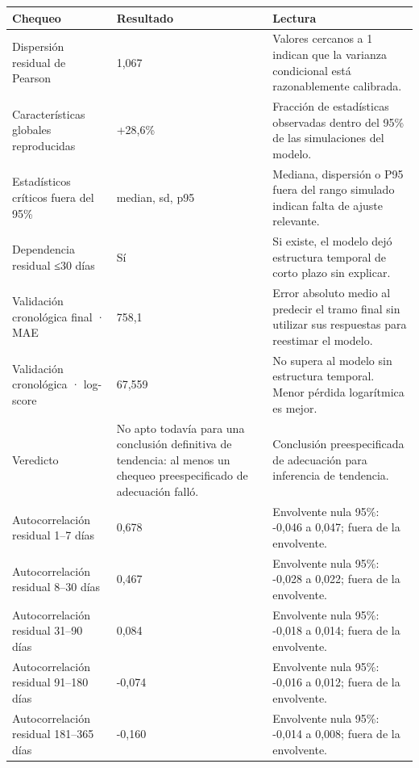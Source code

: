 \begin{tabular}{lll}
\toprule
Chequeo & Resultado & Lectura \\
\midrule
Dispersión residual de Pearson & 1,067 & Valores cercanos a 1 indican que la varianza condicional está razonablemente calibrada. \\
Características globales reproducidas & +28,6\% & Fracción de estadísticas observadas dentro del 95\% de las simulaciones del modelo. \\
Estadísticos críticos fuera del 95\% & median, sd, p95 & Mediana, dispersión o P95 fuera del rango simulado indican falta de ajuste relevante. \\
Dependencia residual ≤30 días & Sí & Si existe, el modelo dejó estructura temporal de corto plazo sin explicar. \\
Validación cronológica final · MAE & 758,1 & Error absoluto medio al predecir el tramo final sin utilizar sus respuestas para reestimar el modelo. \\
Validación cronológica · log-score & 67,559 & No supera al modelo sin estructura temporal. Menor pérdida logarítmica es mejor. \\
Veredicto & No apto todavía para una conclusión definitiva de tendencia: al menos un chequeo preespecificado de adecuación falló. & Conclusión preespecificada de adecuación para inferencia de tendencia. \\
Autocorrelación residual 1–7 días & 0,678 & Envolvente nula 95\%: -0,046 a 0,047; fuera de la envolvente. \\
Autocorrelación residual 8–30 días & 0,467 & Envolvente nula 95\%: -0,028 a 0,022; fuera de la envolvente. \\
Autocorrelación residual 31–90 días & 0,084 & Envolvente nula 95\%: -0,018 a 0,014; fuera de la envolvente. \\
Autocorrelación residual 91–180 días & -0,074 & Envolvente nula 95\%: -0,016 a 0,012; fuera de la envolvente. \\
Autocorrelación residual 181–365 días & -0,160 & Envolvente nula 95\%: -0,014 a 0,008; fuera de la envolvente. \\
\bottomrule
\end{tabular}
